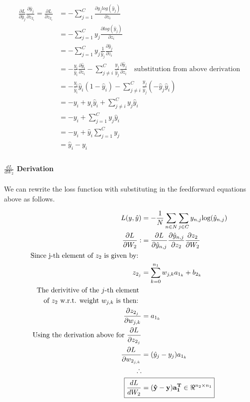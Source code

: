 \documentclass[]{article}
\begin{document}
\begin{align*}
 \frac{\partial L }{\partial  \hat{y}_{j} }  \frac{\partial  \hat{y}_{j} }{\partial z_{2_i}}  =\frac{\partial L}{\partial z_{2_i}} &= - \sum_{j=1}^C \frac{\partial y_j log(\hat{y}_j)}{\partial z_i}{} \\
&=- \sum_{j=1}^C y_j \frac{\partial log(\hat{y}_j)}{\partial z_i} \\
&= - \sum_{j=1}^C y_j \frac{1}{\hat{y}_j} \frac{\partial \hat{y}_j}{\partial z_i} \\
&= - \frac{y_i}{\hat{y}_i} \frac{\partial \hat{y}_i}{\partial z_i} - \sum_{j \neq i}^C \frac{y_j}{\hat{y}_j} \frac{\partial \hat{y}_j}{\partial z_i} \quad \text{substitution from above derivation}\\
&= - \frac{y_i}{\hat{y}_i} \hat{y}_i (1-\hat{y}_i) - \sum_{j \neq i}^C \frac{y_j}{\hat{y}_j} (-\hat{y}_j \hat{y}_i) \\
&= - y_i + y_i \hat{y}_i + \sum_{j \neq i}^C y_j \hat{y}_i  \\
&= - y_i + \sum_{j = 1}^C y_j \hat{y}_i \\
&= -y_i + \hat{y}_i \sum_{j = 1}^C y_j \\
& = \hat{y}_i - y_i \\
\end{align*}
\paragraph{ $\frac{dL}{dW_2}$ Derivation}
We can rewrite the loss function with substituting in the feedforward equations above as follows.

\begin{align*}
L(y,\hat{y}) &= -  \frac{1}{N} \sum_{n \in N} \sum_{j\in C} y_{n,j} \text{log}(\hat{y}_{n,j} ) \\
\frac{\partial L}{\partial W_2} : &=  \frac{\partial L }{\partial  \hat{y}_{n,j} }      \frac{\partial  \hat{y}_{n,j} }{\partial z_2} \frac{\partial z_2}{\partial W_2}\\
\text{Since j-th element of $z_2$ is given by: } \\
z_{2_j} &= \sum_{k = 0}^{n_1}w_{j,k}a_{1_k} + b_{2_k}\\ 
\text{The derivitive of the $j$-th element }\\
\text{of $z_2$ w.r.t. weight $w_{j,k}$ is then: }\\
\frac{\partial z_{2_j}}{\partial w_{j,k}} &= a_{1_k}\\
\text{Using the derivation above for  $\frac{\partial L}{\partial z_{2_j}}$}\\
\frac{\partial L}{\partial w_{2_{j,k}}} &=  (\hat{y}_j - y_j )a_{1_k} \\
\therefore \\
\Aboxed{ \frac{dL}{dW_2} &= (\mathbf{\hat{y} - y})\mathbf{a_1^T} \in  \Re^{n_2 \times n_1}}\\
\end{align*}
\end{document}
